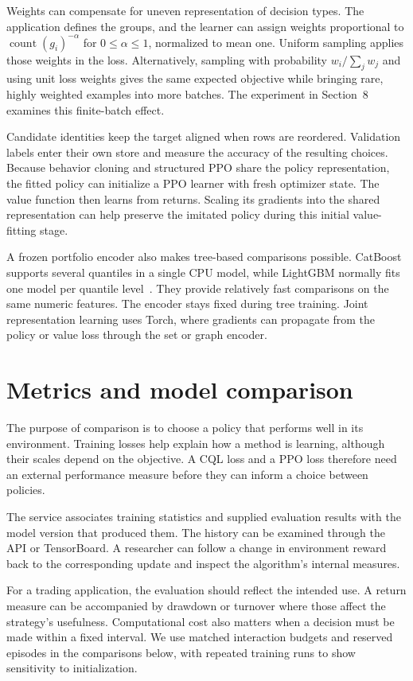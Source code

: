 \documentclass{strategynet-journal}
\begin{document}
Weights can compensate for uneven representation of decision types. The
application defines the groups, and the learner can assign weights proportional
to $\operatorname{count}(g_i)^{-\alpha}$ for $0\leq\alpha\leq1$, normalized to
mean one. Uniform sampling applies those weights in the loss. Alternatively,
sampling with probability $w_i/\sum_jw_j$ and using unit loss weights gives the
same expected objective while bringing rare, highly weighted examples into
more batches. The experiment in Section~8 examines this finite-batch effect.

Candidate identities keep the target aligned when rows are reordered.
Validation labels enter their own store and measure the accuracy of the
resulting choices. Because behavior cloning and structured PPO share the
policy representation, the fitted policy can initialize a PPO learner with
fresh optimizer state. The value function then learns from returns. Scaling
its gradients into the shared representation can help preserve the imitated
policy during this initial value-fitting stage.

A frozen portfolio encoder also makes tree-based comparisons possible.
CatBoost supports several quantiles in a single CPU model, while LightGBM
normally fits one model per quantile level~\cite{catboost,lightgbm,catboostdocs,lightgbmdocs}.
They provide relatively fast comparisons on the same numeric features.
The encoder stays fixed during tree training. Joint representation learning
uses Torch, where gradients can propagate from the policy or value loss
through the set or graph encoder.

\section{Metrics and model comparison}

The purpose of comparison is to choose a policy that performs well in its
environment. Training losses help explain how a method is learning, although
their scales depend on the objective. A CQL loss and a PPO loss therefore
need an external performance measure before they can inform a choice between
policies.

The service associates training statistics and supplied evaluation results
with the model version that produced them. The history can be examined through
the API or TensorBoard. A researcher can follow a change in environment reward
back to the corresponding update and inspect the algorithm's internal measures.

For a trading application, the evaluation should reflect the intended use.
A return measure can be accompanied by drawdown or turnover where those affect
the strategy's usefulness. Computational cost also matters when a decision
must be made within a fixed interval. We use matched interaction budgets and
reserved episodes in the comparisons below, with repeated training runs to
show sensitivity to initialization.
\end{document}
